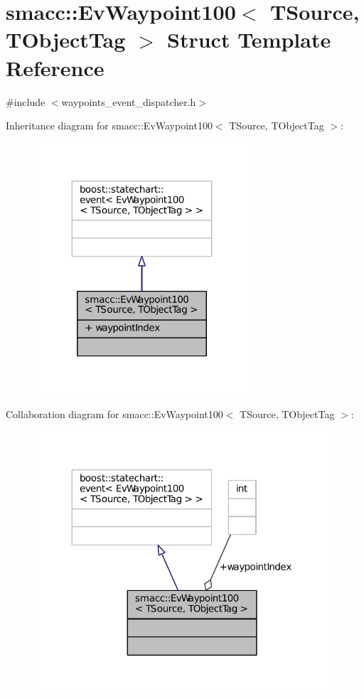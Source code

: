 \hypertarget{structsmacc_1_1EvWaypoint100}{}\section{smacc\+:\+:Ev\+Waypoint100$<$ T\+Source, T\+Object\+Tag $>$ Struct Template Reference}
\label{structsmacc_1_1EvWaypoint100}


{\ttfamily \#include $<$waypoints\+\_\+event\+\_\+dispatcher.\+h$>$}



Inheritance diagram for smacc\+:\+:Ev\+Waypoint100$<$ T\+Source, T\+Object\+Tag $>$\+:
\nopagebreak
\begin{figure}[H]
\begin{center}
\leavevmode
\includegraphics[width=227pt]{structsmacc_1_1EvWaypoint100__inherit__graph}
\end{center}
\end{figure}


Collaboration diagram for smacc\+:\+:Ev\+Waypoint100$<$ T\+Source, T\+Object\+Tag $>$\+:
\nopagebreak
\begin{figure}[H]
\begin{center}
\leavevmode
\includegraphics[width=312pt]{structsmacc_1_1EvWaypoint100__coll__graph}
\end{center}
\end{figure}
